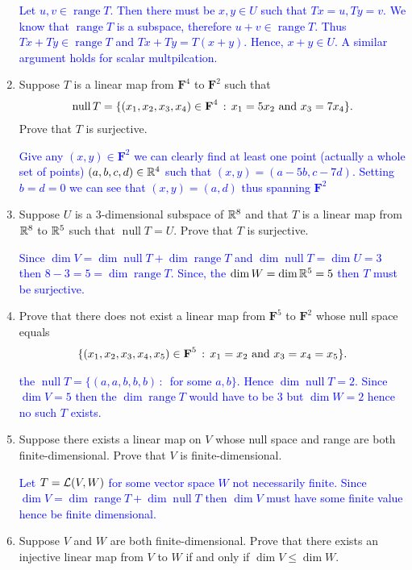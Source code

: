 \documentclass[10pt,a4paper]{report}
\DeclareMathOperator{\RANGE}{range}
\DeclareMathOperator{\NULL}{null}
\newcommand{\BLUE}[1]{\textcolor{blue}{#1}}
\newcommand{\F}{\textbf{F}}
\begin{document}
\begin{enumerate}
\BLUE{Let $u,v \in \RANGE T$.  Then there must be $x,y \in U$ such that $Tx=u, Ty=v$.  We know that $\RANGE T$ is a subspace, therefore $u+v \in \RANGE T$.  Thus $Tx+Ty \in \RANGE T$ and $Tx+Ty=T(x+y)$.  Hence, $x+y \in U$.  A similar argument holds for scalar multpilcation.
}

\item Suppose $T$ is a linear map from $\F^4$ to $\F^2$ such that 
\begin{align*}
	\NULL T = \{(x_1,x_2,x_3,x_4)\in \F^4\,:\, x_1=5x_2\AND x_3=7x_4\}.
\end{align*}Prove that $T$ is surjective.

\BLUE{Give any $(x,y)\in \F^2$ we can clearly find at least one point (actually a whole set of points) $(a,b,c,d) \in \mathbb{R}^4$ such that $(x,y)=(a-5b,c-7d)$.  Setting $b=d=0$ we can see that $(x,y)=(a,d)$ thus spanning $\F^2$
}

\item Suppose $U$ is a 3-dimensional subspace of $\mathbb{R}^8$ and that $T$ is a linear map from $\mathbb{R}^8$ to $\mathbb{R}^5$ such that $\NULL T= U$.  Prove that $T$ is surjective.

\BLUE{Since $\dim V = \dim \NULL T + \dim \RANGE T$ and $\dim \NULL T = \dim U = 3$ then $8-3=5=\dim \RANGE T$.  Since, the $\dim W = \dim \mathbb{R}^5 = 5$ then $T$ must be surjective.
}

\item Prove that there does not exist a linear map from $\F^5$ to $\F^2$ whose null space equals
\begin{align*}
\{(x_1,x_2,x_3,x_4,x_5)\in \F^5\,:\,x_1=x_2\AND x_3=x_4=x_5\}.
\end{align*}

\BLUE{the $\NULL T = \{(a,a,b,b,b)\,:\,$ for some $a,b\}$.  Hence $\dim\NULL T = 2$.  Since $\dim V = 5$ then the $\dim \RANGE T$ would have to be 3 but $\dim W = 2$ hence no such $T$ exists.
}

\item Suppose there exists a linear map on $V$ whose null space and range are both finite-dimensional.  Prove that $V$ is finite-dimensional.

\BLUE{Let $T=\mathcal{L}(V,W)$ for some vector space $W$ not necessarily finite.  Since $\dim V = \dim \RANGE T + \dim \NULL T$ then $\dim V$ must have some finite value hence be finite dimensional.
}

\item Suppose $V$ and $W$ are both finite-dimensional.  Prove that there exists an injective linear map from $V$ to $W$ if and only if $\dim V \le \dim W$.


\end{enumerate}
\end{document}
